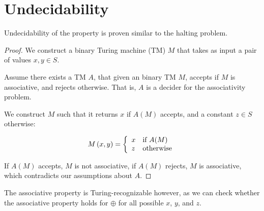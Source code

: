\section{Undecidability}\label{section:undecidability}

Undecidability of the property is proven similar to the halting problem.

\begin{proof} We construct a binary Turing machine (TM) $M$ that takes as input
a pair of values $x,y\in S$.

Assume there exists a TM $A$, that given an binary TM $M$, accepts if $M$ is
associative, and rejects otherwise. That is, $A$ is a decider for the
associativity problem.

We construct $M$ such that it returns $x$ if $A(M)$ accepts, and a constant
$z\in S$ otherwise:

\[M\left({x,y}\right) = \left\{ \begin{array}{l l} x & \text{if $A(M)$} \\ z &
\text{otherwise} \end{array} \right.\]

If $A(M)$ accepts, $M$ is not associative, if $A(M)$ rejects, $M$ is
associative, which contradicts our assumptions about $A$. \end{proof}

The associative property is Turing-recognizable however, as we can check
whether the associative property holds for $\oplus$ for all possible $x$, $y$,
and $z$.

